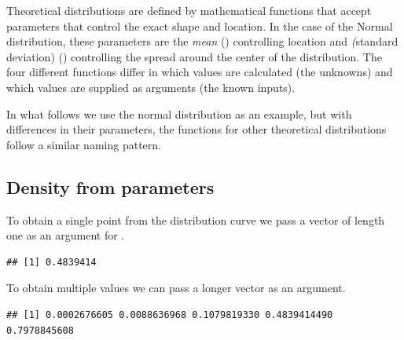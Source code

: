 \documentclass[krantz2]{krantz}\usepackage{knitr}
\begin{document}
Theoretical distributions are defined by mathematical functions that accept parameters that control the exact shape and location. In the case of the Normal distribution, these parameters are the \emph{mean} () controlling location and \emph(standard deviation) () controlling the spread around the center of the distribution. The four different functions differ in which values are calculated (the unknowns) and which values are supplied as arguments (the known inputs).

In what follows we use the normal distribution as an example, but with differences in their parameters, the functions for other theoretical distributions follow a similar naming pattern.

\subsection{Density from parameters}\label{sec:prob:dens}
To obtain a single point from the distribution curve we pass a vector of length one as an argument for .
\begin{knitrout}\footnotesize
{}\color{fgcolor}\begin{kframe}
\begin{alltt}
\hlstd{(} \hlstd{=} \hlstd{,}  \hlstd{=} \hlstd{,}  \hlstd{=} \hlstd{)}
\end{alltt}
\begin{verbatim}
## [1] 0.4839414
\end{verbatim}
\end{kframe}
\end{knitrout}

To obtain multiple values we can pass a longer vector as an argument.

\begin{knitrout}\footnotesize
{}\color{fgcolor}\begin{kframe}
\begin{alltt}
\hlstd{(} \hlstd{=} \hlstd{(} \hlstd{=} \hlopt{-}\hlstd{,}  \hlstd{=} \hlstd{,}  \hlstd{=} \hlstd{),}  \hlstd{=} \hlstd{,}  \hlstd{=} \hlstd{)}
\end{alltt}
\begin{verbatim}
## [1] 0.0002676605 0.0088636968 0.1079819330 0.4839414490 0.7978845608
\end{verbatim}
\end{kframe}
\end{knitrout}
\end{document}
